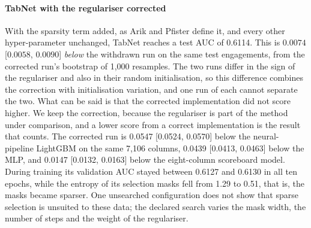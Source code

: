\paragraph{TabNet with the regulariser corrected}
With the sparsity term added, as Arik and Pfister define it, and every other hyper-parameter unchanged,
TabNet reaches a test AUC of 0.6114. This is $0.0074$ [$0.0058$, $0.0090$] \emph{below} the withdrawn run
on the same test engagements, from the corrected run's bootstrap of 1,000 resamples. The two runs differ in
the sign of the regulariser and also in their random initialisation, so this difference combines the
correction with initialisation variation, and one run of each cannot separate the two. What can be said is
that the corrected implementation did not score higher. We keep the correction, because the regulariser is
part of the method under comparison, and a lower score from a correct implementation is the result that
counts. The corrected run is 0.0547 [0.0524, 0.0570] below the neural-pipeline LightGBM on the same
7,106 columns, 0.0439 [0.0413, 0.0463] below the MLP, and 0.0147 [0.0132, 0.0163] below the eight-column
scoreboard model. During training its validation AUC stayed between 0.6127 and 0.6130 in all ten epochs,
while the entropy of its selection masks fell from 1.29 to 0.51, that is, the masks became sparser. One
unsearched configuration does not show that sparse selection is unsuited to these data; the declared
search varies the mask width, the number of steps and the weight of the regulariser.

